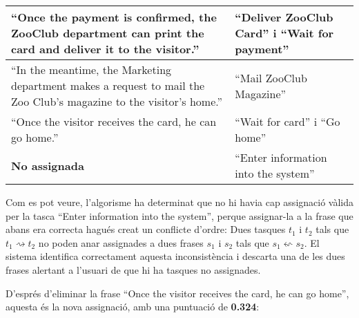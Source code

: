 \begin{center}
\begin{tabular}{|p{}|p{}|}
    ``Once the payment is confirmed, the ZooClub department can print the card and deliver it to the visitor.'' & ``Deliver ZooClub Card'' i ``Wait for payment''\\\hline
    ``In the meantime, the Marketing department makes a request to mail the Zoo Club's magazine to the visitor's home.'' & ``Mail ZooClub Magazine'' \\\hline
    ``Once the visitor receives the card, he can go home.'' & ``Wait for card'' i ``Go home'' \\\hline
    \textbf{No assignada} & ``Enter information into the system'' \\\hline
\end{tabular}
\end{center}

Com es pot veure, l'algorisme ha determinat que no hi havia cap assignació vàlida per la tasca ``Enter information into the system'', perque assignar-la a la frase que abans era correcta hagués creat un conflicte d'ordre: Dues tasques $t_1$ i $t_2$ tals que $t_1 \rightsquigarrow t_2$ no poden anar assignades a dues frases $s_1$ i $s_2$ tals que $s_1 \leftsquigarrow s_2$. El sistema identifica correctament aquesta inconsistència i descarta una de les dues frases alertant a l'usuari de que hi ha tasques no assignades.

D'esprés d'eliminar la frase ``Once the visitor receives the card, he can go home'', aquesta és la nova assignació, amb una puntuació de \textbf{0.324}:

